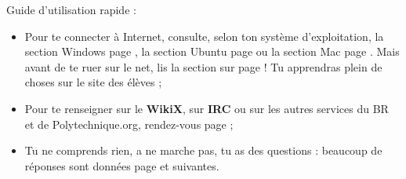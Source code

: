 Guide d'utilisation rapide :
\begin{itemize}
\item Pour te connecter à Internet, consulte, selon ton système d'exploitation, la section Windows page \pageref{windows}, la section Ubuntu page \pageref{ubuntu} ou la section Mac page \pageref{mac}. Mais avant de te ruer sur le net, lis la section sur \fkz page \pageref{services} ! Tu apprendras plein de choses sur le site des élèves ;
\item Pour te renseigner sur le \textbf{WikiX}, sur \textbf{IRC} ou sur les autres services du BR et de Polytechnique.org, rendez-vous page \pageref{services} ;
\item Tu ne comprends rien, a ne marche pas, tu as des questions : beaucoup de réponses sont données page \pageref{faq} et suivantes.

\end{itemize}
